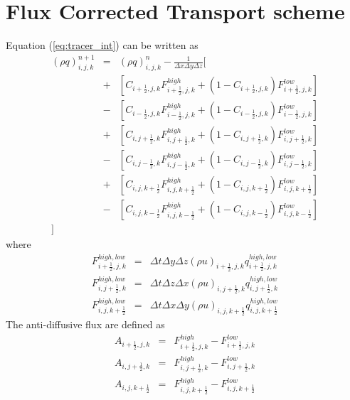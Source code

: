 {\section{Flux Corrected Transport scheme}
Equation (\ref{eq:tracer_int}) can be written as
\begin{eqnarray}
\left(\rho q\right)^{n+1}_{i,j,k} 
&=& \left(\rho q\right)^{n}_{i,j,k}
- \frac{1}{\Delta x \Delta y \Delta z}
\big[ \nonumber\\
&+&
\left[ C_{i+\frac{1}{2},j,k} F_{i+\frac{1}{2},j,k}^{high}
+ \left( 1 - C_{i+\frac{1}{2},j,k}\right) F_{i+\frac{1}{2},j,k}^{low}\right]\nonumber\\
&-&
\left[ C_{i-\frac{1}{2},j,k} F_{i-\frac{1}{2},j,k}^{high}
+ \left( 1 - C_{i-\frac{1}{2},j,k}\right) F_{i-\frac{1}{2},j,k}^{low}\right]\nonumber\\
&+&
\left[ C_{i,j+\frac{1}{2},k} F_{i,j+\frac{1}{2},k}^{high}
+ \left( 1 - C_{i,j+\frac{1}{2},k}\right) F_{i,j+\frac{1}{2},k}^{low}\right]\nonumber\\
&-&
\left[ C_{i,j-\frac{1}{2},k} F_{i,j-\frac{1}{2},k}^{high}
+ \left( 1 - C_{i,j-\frac{1}{2},k}\right) F_{i,j-\frac{1}{2},k}^{low}\right]\nonumber\\
&+&
\left[ C_{i,j,k+\frac{1}{2}} F_{i,j,k+\frac{1}{2}}^{high}
+ \left( 1 - C_{i,j,k+\frac{1}{2}}\right) F_{i,j,k+\frac{1}{2}}^{low}\right]\nonumber\\
&-&
\left[ C_{i,j,k-\frac{1}{2}} F_{i,j,k-\frac{1}{2}}^{high}
+ \left( 1 - C_{i,j,k-\frac{1}{2}}\right) F_{i,j,k-\frac{1}{2}}^{low}\right]\nonumber\\
\big]
\label{eq:1step_integ_tracer}
\end{eqnarray}
where
\begin{eqnarray}
  F_{i+\frac{1}{2},j,k}^{high,low} &=& \Delta t \Delta y \Delta z (\rho u)_{i+\frac{1}{2},j,k} q_{i+\frac{1}{2},j,k}^{high,low}\\
  F_{i,j+\frac{1}{2},k}^{high,low} &=& \Delta t \Delta z \Delta x (\rho u)_{i,j+\frac{1}{2},k} q_{i,j+\frac{1}{2},k}^{high,low}\\
  F_{i,j,k+\frac{1}{2}}^{high,low} &=& \Delta t \Delta x \Delta y (\rho u)_{i,j,k+\frac{1}{2}} q_{i,j,k+\frac{1}{2}}^{high,low}
\end{eqnarray}
The anti-diffusive flux are defined as
\begin{eqnarray}
  A_{i+\frac{1}{2},j,k} &=& F_{i+\frac{1}{2},j,k}^{high}-F_{i+\frac{1}{2},j,k}^{low}\\
  A_{i,j+\frac{1}{2},k} &=& F_{i,j+\frac{1}{2},k}^{high}-F_{i,j+\frac{1}{2},k}^{low}\\
  A_{i,j,k+\frac{1}{2}} &=& F_{i,j,k+\frac{1}{2}}^{high}-F_{i,j,k+\frac{1}{2}}^{low}
\end{eqnarray}

}
